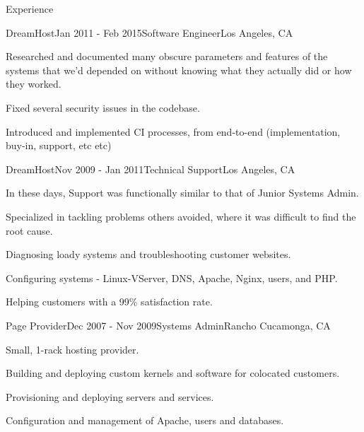 \documentclass{resume} %
\begin{document}
\begin{rSection}{Experience}
\begin{rSubsection}{DreamHost}{Jan 2011 - Feb 2015}{Software Engineer}{Los Angeles, CA}
\item Researched and documented many obscure parameters and features of the systems that we'd depended on without knowing what they actually did or how they worked.
\item Fixed several security issues in the codebase.
\item Introduced and implemented CI processes, from end-to-end (implementation, buy-in, support, etc etc)
\end{rSubsection}


\begin{rSubsection}{DreamHost}{Nov 2009 - Jan 2011}{Technical Support}{Los Angeles, CA}
\item In these days, Support was functionally similar to that of Junior Systems Admin.
\item Specialized in tackling problems others avoided, where it was difficult to find the root cause.
\item Diagnosing loady systems and troubleshooting customer websites.
\item Configuring systems - Linux-VServer, DNS, Apache, Nginx, users, and PHP.
\item Helping customers with a 99\% satisfaction rate.
\end{rSubsection}


\begin{rSubsection}{Page Provider}{Dec 2007 - Nov 2009}{Systems Admin}{Rancho Cucamonga, CA}
\item Small, 1-rack hosting provider.
\item Building and deploying custom kernels and software for colocated customers.
\item Provisioning and deploying servers and services.
\item Configuration and management of Apache, users and databases.
\end{rSubsection}

\end{rSection}

\end{document}
